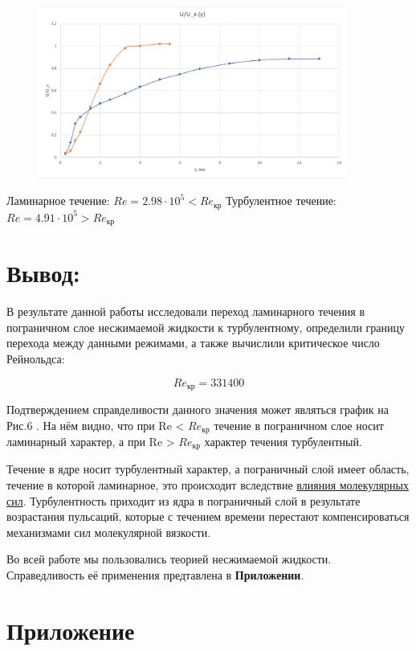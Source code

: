 \documentclass[a4paper]{article}
\begin{document}
\begin {figure}[H]
\begin{center}
\par
\includegraphics[width=0.9\textwidth]{uuz.png}
\caption{}
\end{center}
\end {figure}


Ламинарное течение: $Re = 2.98 \cdot 10^5 < Re_\text{кр}$
Турбулентное течение: $Re = 4.91 \cdot 10^5 > Re_\text{кр} $

\section*{Вывод:}

В результате данной работы исследовали переход ламинарного течения в пограничном слое несжимаемой жидкости к турбулентному, определили границу перехода между данными режимами, а также вычислили критическое число Рейнольдса:  

$$Re_\text{кр} = 331400$$

Подтверждением справделивости данного значения может являться график на Рис.6 . На нём видно, что при Re < $Re_\text{кр}$ течение в пограничном слое носит ламинарный характер, а при Re > $Re_\text{кр}$ характер течения турбулентный.


Течение в ядре носит турбулентный характер, а пограничный слой имеет область, течение в которой ламинарное, это происходит вследствие \underline{влияния молекулярных сил}. Турбулентность приходит из ядра в пограничный слой в результате возрастания пульсаций, которые с течением времени перестают компенсироваться механизмами сил молекулярной вязкости.

Во всей работе мы пользовались теорией несжимаемой жидкости. Справедливость её применения предтавлена в \textbf{Приложении}.

\newpage
\section*{Приложение}
\end{document}
